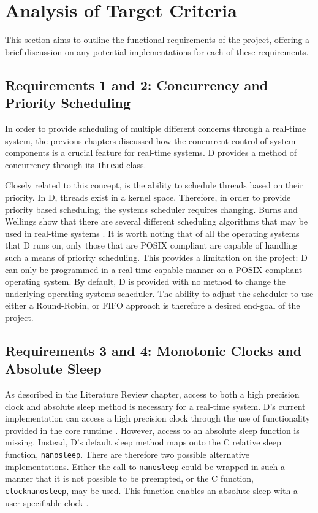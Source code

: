 \section{Analysis of Target Criteria} %
This section aims to outline the functional requirements of the project,
offering a brief discussion on any potential implementations for each of these 
requirements. 

\subsection{Requirements 1 and 2: Concurrency and Priority Scheduling} %
In order to provide scheduling of multiple different concerns through a
real-time system, the previous chapters discussed how the concurrent control of
system components is a crucial feature for real-time systems. D provides a
method of concurrency through its \texttt{Thread} class. 
\par\bigskip\noindent
Closely related to this concept, is the ability to schedule threads based on
their priority. In D, threads exist in a kernel space. Therefore, in order to
provide priority based scheduling, the systems scheduler requires changing. Burns
and Wellings show that there are several different scheduling algorithms that
may be used in real-time systems \cite{real-time-systems}. It is worth noting
that of all the operating systems that D runs on, only those that are POSIX
compliant are capable of handling such a means of priority scheduling. This
provides a limitation on the project: D can only be programmed in a real-time
capable manner on a POSIX compliant operating system.
By default, D is provided with no method to change the underlying operating
systems scheduler. 
The ability to adjust the scheduler to use either a Round-Robin, or FIFO approach 
is therefore a desired end-goal of the project.

\subsection{Requirements 3 and 4: Monotonic Clocks and Absolute Sleep} %
As described in the Literature Review chapter, access to both a high precision
clock and absolute sleep method is necessary for a real-time system. D's
current implementation can access a high precision clock through the use of
functionality provided in the core runtime \cite{dlang-core-time}. However,
access to an absolute sleep function is missing. Instead, D's default sleep
method maps onto the C relative sleep function, \texttt{nanosleep}. There are
therefore two possible alternative implementations. Either the call to
\texttt{nanosleep} could be wrapped in such a manner that it is not possible to be preempted, 
or the C function, \texttt{clock\textunderscore{}nanosleep}, may be used. This function enables 
an absolute sleep with a user specifiable clock \cite{clock-nanosleep}. 


